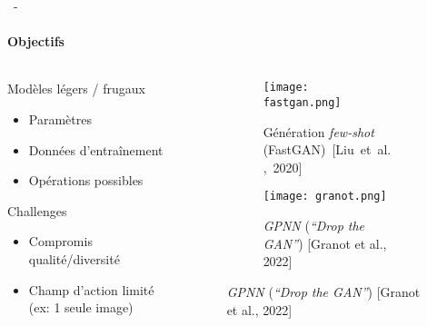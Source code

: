 \documentclass[aspectratio=169, 22pt]{beamer}
\begin{document}
\begin{frame}{\secname~- \subsecname}
  \framesubtitle{Objectifs}
  \begin{columns}
    \begin{column}{0.5\linewidth}
      \begin{customblock}{Modèles légers / frugaux}
        \begin{itemize}
        \item \small Paramètres
        \item \small Données d'entraînement
        \item \small Opérations possibles
        \end{itemize}
      \end{customblock}
      \begin{alertblock}{Challenges}
        \begin{itemize}
        \item \small Compromis qualité/diversité
        \item \small Champ d'action limité (ex: 1 seule image)
        \end{itemize}
      \end{alertblock}
    \end{column}
    \begin{column}{0.5\linewidth}
      \begin{figure}
        \centering
        \begin{subfigure}{\linewidth}
          \centering
          \texttt{[image: fastgan.png]}
          \caption{Génération \emph{few-shot} (FastGAN) [Liu et al., 2020]}
        \end{subfigure}
        
        \begin{subfigure}{\linewidth}
          \centering
          \texttt{[image: granot.png]}
          \caption{\emph{GPNN} (\emph{``Drop the GAN''}) [Granot et al., 2022]}
        \end{subfigure}
      \end{figure}
    \end{column}
  \end{columns}
\end{frame}
\end{document}
